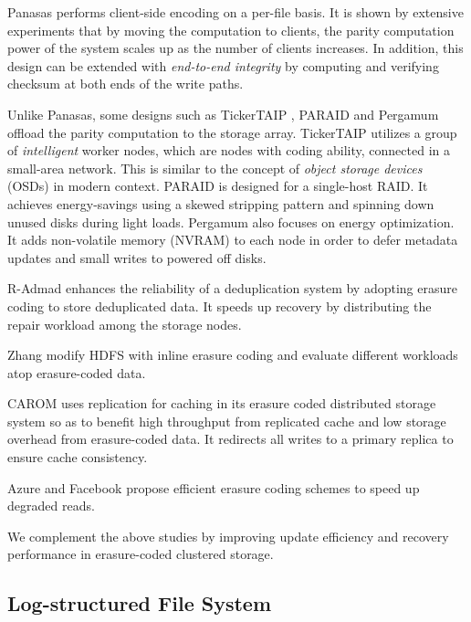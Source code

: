 Panasas \cite{welch08} performs client-side encoding on a per-file basis. It is
shown by extensive experiments that by moving the computation to clients, the
parity computation power of the system scales up as the number of clients
increases. In addition, this design can be extended with \textit{end-to-end
    integrity} by computing and verifying checksum at both ends of the write
paths.

Unlike Panasas, some designs such as TickerTAIP \cite{cao94}, PARAID
\cite{weddle07} and Pergamum \cite{storer08} offload the parity computation to
the storage array. TickerTAIP utilizes a group of \textit{intelligent} worker
nodes, which are nodes with coding ability, connected in a small-area network.
This is similar to the concept of \textit{object storage devices} (OSDs) in
modern context. PARAID is designed for a single-host RAID. It achieves
energy-savings using a skewed stripping pattern and spinning down unused disks
during light loads. Pergamum also focuses on energy optimization. It adds
non-volatile memory (NVRAM) to each node in order to defer metadata updates and
small writes to powered off disks.

R-Admad \cite{liu09} enhances the reliability of a deduplication
system by adopting erasure coding to store deduplicated data. It speeds up
recovery by distributing the repair workload among the storage nodes.

Zhang \etal \cite{zhang10} modify HDFS with inline erasure coding and
evaluate different workloads atop erasure-coded data.

CAROM \cite{ma13} uses replication for caching in its erasure coded distributed
storage system so as to benefit high throughput from replicated cache and low
storage overhead from erasure-coded data. It redirects all writes to a primary
replica to ensure cache consistency. 

Azure \cite{huang12} and Facebook \cite{sathiamoorthy13} propose efficient
erasure coding schemes to speed up degraded reads. 

We complement the above studies by improving update efficiency and recovery
performance in erasure-coded clustered storage. 


\subsection{Log-structured File System}


